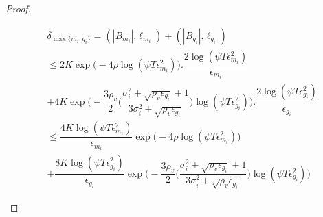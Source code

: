 \begin{proof}
\begin{small}
\begin{align*}
&\delta_{\max\lbrace m_{i}, g_{i}\rbrace}=(|B_{m_{i}}|.\ell_{m_{i}}) + (|B_{g_{i}}|.\ell_{g_{i}})\\
&\leq 2K\exp\bigg(-4\rho\log (\psi T\epsilon_{m_{i}}^{2})\bigg).\dfrac{2\log (\psi T \epsilon_{m_{i}}^{2})}{\epsilon_{m_{i}}}\\
 & + 4K\exp\bigg(- \dfrac{3\rho_v}{2} \bigg(\dfrac{\sigma_{i}^{2}+\sqrt{\rho_{v}\epsilon_{g_{i}}}+1}{3\sigma_{i}^{2}+\sqrt{\rho_v \epsilon_{g_{i}}}}\bigg) \log(\psi T\epsilon_{g_{i}}^{2})\bigg).\dfrac{2\log (\psi T \epsilon_{g_{i}}^{2})}{\epsilon_{g_{i}}} \\
& \leq \dfrac{4K\log (\psi T \epsilon_{m_{i}}^{2})}{\epsilon_{m_{i}}}\exp\bigg(-4\rho\log (\psi T\epsilon_{m_{i}}^{2})\bigg)\\
& + \dfrac{8K\log (\psi T \epsilon_{g_{i}}^{2})}{\epsilon_{g_{i}}}\exp\bigg(- \dfrac{3\rho_v}{2} \bigg(\dfrac{\sigma_{i}^{2}+\sqrt{\rho_{v}\epsilon_{g_{i}}}+1}{3\sigma_{i}^{2}+\sqrt{\rho_v \epsilon_{g_{i}}}}\bigg) \log(\psi T\epsilon_{g_{i}}^{2}) \bigg)
\end{align*}
\end{small}



\end{proof}
